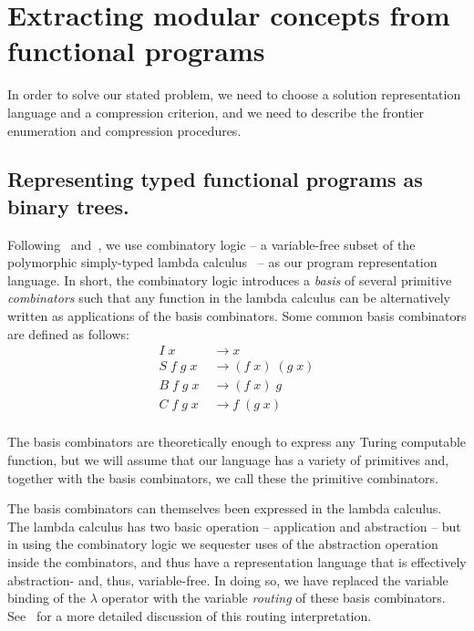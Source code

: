 \documentclass{article}
\begin{document}

\section{Extracting modular concepts from functional programs}

In order to solve our stated problem, we need to choose a solution
representation language and a compression criterion, and we need to
describe the frontier enumeration and compression procedures.

\subsection{Representing typed functional programs as binary trees.}

Following~\cite{liang10programs} and~\cite{Briggs:2008}, we use
combinatory logic -- a variable-free subset of the polymorphic
simply-typed lambda calculus~\cite{Pierce_2002} -- as
our program representation language. In short, the combinatory logic
introduces a \emph{basis} of several primitive \emph{combinators} such
that any function in the lambda calculus can be alternatively written
as applications of the basis combinators. Some common basis
combinators are defined as follows:
\begin{align}
I\; x &\rightarrow  x \\
S\; f\; g\; x\; &\rightarrow (f\; x)\; (g\; x) \\ 
B\; f\; g\; x\; &\rightarrow (f\; x)\; g \\ 
C\; f\; g\; x\; &\rightarrow f\; (g\; x) \\ 
\end{align}

The basis
combinators are theoretically enough to express any Turing computable
function, but we will assume that our language has a variety of
primitives and, together with the basis combinators, we call these the
primitive combinators.

The basis combinators can themselves been expressed in the lambda
calculus. The lambda calculus has two basic operation -- application
and abstraction -- but in using the combinatory logic we sequester
uses of the abstraction operation inside the combinators, and thus
have a representation language that is effectively abstraction- and,
thus, variable-free. In doing so, we have replaced the variable
binding of the $\lambda$ operator with the variable \emph{routing} of
these basis combinators. See~\cite{liang10programs} for a more
detailed discussion of this routing interpretation. 
\end{document}
